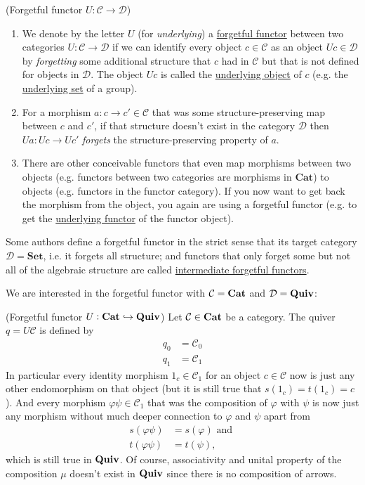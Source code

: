 \begin{example}{(Forgetful functor $U : \mathcal{C} \rightarrow \mathcal{D}$)}
\begin{enumerate}
\renewcommand{\labelenumi}{(\theenumi)}
\item We denote by the letter $U$ (for \textit{underlying}) a \ul{forgetful functor} between two categories $U : \mathcal{C} \rightarrow \mathcal{D}$ if
we can identify every object $c \in \mathcal{C}$ as an object $Uc \in \mathcal{D}$ by \textit{forgetting} some additional structure that $c$ had
in $\mathcal{C}$ but that is not defined for objects in $\mathcal{D}$. The object $Uc$ is called the \ul{underlying object} of $c$ (e.g. the
\ul{underlying set} of a group).
\item For a morphism $a : c \rightarrow c' \in \mathcal{C}$ that was some structure-preserving map between $c$ and $c'$, if that structure doesn't
exist in the category $\mathcal{D}$ then $Ua : Uc \rightarrow Uc'$ \textit{forgets} the structure-preserving property of $a$.
\item There are other conceivable functors that even map morphisms between two objects
(e.g. functors between two categories are morphisms in $\mathrm{\textbf{Cat}}$) to objects (e.g. functors in the functor category). If you now
want to get back the morphism from the object, you again are using a forgetful functor (e.g. to get the \ul{underlying functor} of the functor object).
\end{enumerate}
Some authors define a forgetful functor in the strict sense that its target category $\mathcal{D} = \mathrm{\textbf{Set}}$, i.e. it forgets all structure;
and functors that only forget some but not all of the algebraic structure are called \ul{intermediate forgetful functors}.
\end{example}

\noindent We are interested in the forgetful functor with $\mathcal{C} = \mathrm{\textbf{Cat}}$ and $\mathcal{D} = \mathrm{\textbf{Quiv}}$:

\begin{example}{(Forgetful functor $U  : \mathrm{\textbf{Cat}} \hookrightarrow \mathrm{\textbf{Quiv}}$)}
Let $\mathcal{C} \in \mathrm{\textbf{Cat}}$ be a category. The quiver $q = U\mathcal{C}$ is defined by
\begin{align}
q_{0} &= \mathcal{C}_{0} \\
q_{1} &= \mathcal{C}_{1}
\end{align}
In particular every identity morphism $1_{c} \in \mathcal{C}_{1}$ for an object $c \in \mathcal{C}$ now is just any other endomorphism
on that object (but it is still true that $s(1_{c}) = t(1_{c}) = c$).
And every morphism $\varphi\psi \in \mathcal{C}_{1}$ that was the composition of $\varphi$ with $\psi$ is now just
any morphism without much deeper connection to $\varphi$ and $\psi$ apart from
\begin{align}
s(\varphi\psi) &= s(\varphi) \text{ and } \\
t(\varphi\psi) &= t(\psi),
\end{align}
which is still true in $\mathrm{\textbf{Quiv}}$. Of course, associativity and unital property of the composition $\mu$ doesn't exist in $\mathrm{\textbf{Quiv}}$ since there is no composition
of arrows.
\end{example}

